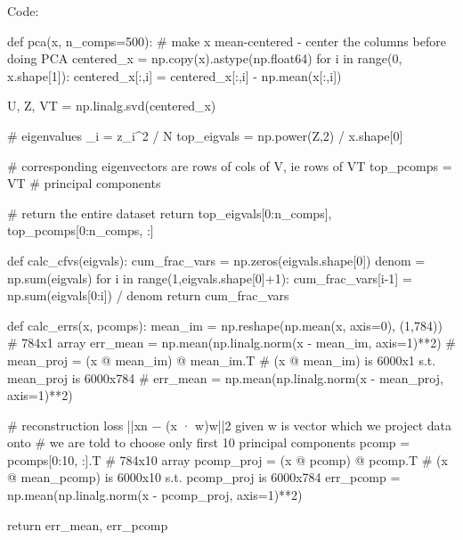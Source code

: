 \documentclass[submit]{harvardml}
\begin{document}
Code:

\begin{python}
def pca(x, n_comps=500):
    # make x mean-centered - center the columns before doing PCA
    centered_x = np.copy(x).astype(np.float64)
    for i in range(0, x.shape[1]):
        centered_x[:,i] = centered_x[:,i] - np.mean(x[:,i])
    
    U, Z, VT = np.linalg.svd(centered_x)
    
    # eigenvalues \lambda_i = z_i^2 / N
    top_eigvals = np.power(Z,2) / x.shape[0]
    
    # corresponding eigenvectors are rows of cols of V, ie rows of VT
    top_pcomps = VT   # principal components 
    
    
    # return the entire dataset
    return top_eigvals[0:n_comps], top_pcomps[0:n_comps, :]

def calc_cfvs(eigvals):
    cum_frac_vars = np.zeros(eigvals.shape[0])
    denom = np.sum(eigvals)
    for i in range(1,eigvals.shape[0]+1):
        cum_frac_vars[i-1] = np.sum(eigvals[0:i]) / denom
    return cum_frac_vars

def calc_errs(x, pcomps):
    mean_im = np.reshape(np.mean(x, axis=0), (1,784)) # 784x1 array
    err_mean = np.mean(np.linalg.norm(x - mean_im, axis=1)**2) 
    # mean_proj = (x @ mean_im) @ mean_im.T   # (x @ mean_im) is 6000x1 s.t. mean_proj is 6000x784
    # err_mean = np.mean(np.linalg.norm(x - mean_proj, axis=1)**2)         
    
    # reconstruction loss ||xn − (x · w)w||2 given w is vector which we project data onto
    # we are told to choose only first 10 principal components
    pcomp = pcomps[0:10, :].T  # 784x10 array
    pcomp_proj = (x @ pcomp) @ pcomp.T   # (x @ mean_pcomp) is 6000x10 s.t. pcomp_proj is 6000x784
    err_pcomp = np.mean(np.linalg.norm(x - pcomp_proj, axis=1)**2)
    
    return err_mean, err_pcomp
\end{python}
\end{document}
